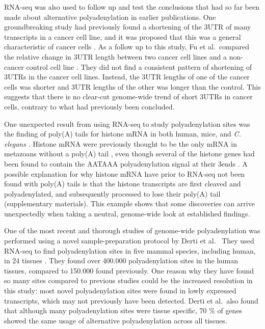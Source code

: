 RNA-seq was also used to follow up and test the conclusions that had so far
been made about alternative polyadenylation in earlier publications. One
groundbreaking study had previously found a shortening of the 3\ppp UTR of many
transcripts in a cancer cell line, and it was proposed that this was a general
characteristic of cancer cells \cite{mayr_widespread_2009}. As a follow up to
this study, Fu et al.\ compared the relative change in 3\ppp UTR length between
two cancer cell lines and a non-cancer control cell line
\cite{fu_differential_2011}. They did not find a consistent pattern of
shortening of 3\ppp UTRs in the cancer cell lines. Instead, the 3\ppp UTR
lengths of one of the cancer cells was shorter and 3\ppp UTR lengths of the
other was longer than the control. This suggests that there is no clear-cut
genome-wide trend of short 3\ppp UTRs in cancer cells, contrary to what had
previously been concluded.

One unexpected result from using RNA-seq to study polyadenylation sites was the
finding of poly(A) tails for histone mRNA in both human, mice, and \textit{C.
elegans} \cite{mangone_landscape_2010, shepard_complex_2011}. Histone mRNA
were previously thought to be the only mRNA in metazoans without a poly(A) tail
\cite{marzluff_metabolism_2008}, even though several of the histone genes had
been found to contain the AATAAA polyadenylation signal at their 3\ppp ends
\cite{keall_histone_2007}. A possible explanation for why histone mRNA have
prior to RNA-seq not been found with poly(A) tails is that the histone
transcripts are first cleaved and polyadenylated, and subsequently processed to
lose their poly(A) tail \cite{mangone_landscape_2010} (supplementary
materials). This example shows that some discoveries can arrive unexpectedly
when taking a neutral, genome-wide look at established findings.

One of the most recent and thorough studies of genome-wide polyadenylation was
performed using a novel sample-preparation protocol by Derti et al.\
\cite{derti_quantitative_2012} They used RNA-seq to find polyadenylation sites in five
mammal species, including human, in 24 tissues \cite{derti_quantitative_2012}.
They found over 400.000 polyadenylation sites in the human tissues, compared to
150.000 found previously. One reason why they have found so many sites compared
to previous studies could be the increased resolution in this study: most novel
polyadenylation sites were found in lowly expressed transcripts, which may not
previously have been detected. Derti et al.\ also found that although many
polyadenylation sites were tissue specific, 70 \% of genes showed the same usage of
alternative polyadenylation across all tissues.
